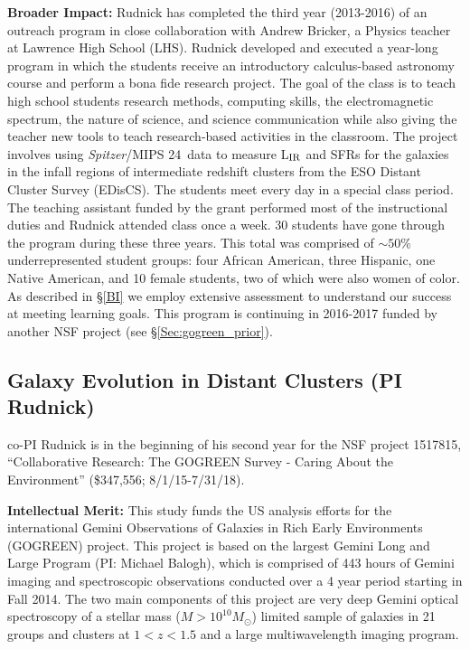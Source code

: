 \documentclass[11pt, preprint]{aastex}
\begin{document}
{\textbf{Broader Impact:} Rudnick has completed the third year
(2013-2016) of an outreach program in close collaboration with Andrew
Bricker, a Physics teacher at Lawrence High School (LHS). Rudnick
developed and executed a year-long program in which the students
receive an introductory calculus-based astronomy course and perform a
bona fide research project. The goal of the class is to teach high
school students research methods, computing skills, the
electromagnetic spectrum, the nature of science, and science
communication while also giving the teacher new tools to teach
research-based activities in the classroom.  The project involves
using \textit{Spitzer}/MIPS 24\micron\ data to measure L$_{\rm IR}$
and SFRs for the galaxies in the infall regions of intermediate
redshift clusters from the ESO Distant Cluster Survey (EDisCS). The
students meet every day in a special class period. The teaching
assistant funded by the grant performed most of the instructional
duties and Rudnick attended class once a week.  30 students have gone
through the program during these three years.  This total was
comprised of $\sim 50\%$ underrepresented student groups: four African
American, three Hispanic, one Native American, and 10 female students,
two of which were also women of color.  As described in \S\ref{BI} we
employ extensive assessment to understand our success at meeting
learning goals.  This program is continuing in 2016-2017 funded by
another NSF project (see \S\ref{Sec:gogreen_prior}).

\vspace*{-.7cm}
\subsection{Galaxy Evolution in Distant Clusters (PI Rudnick)}
\vspace*{-.4cm}
\label{Sec:gogreen_prior}

co-PI Rudnick is in the beginning of his second year for the NSF
project 1517815, ``Collaborative Research: The GOGREEN Survey - Caring
About the Environment'' (\$347,556; 8/1/15-7/31/18).

\textbf{Intellectual Merit:} This study funds the US analysis efforts
for the international Gemini Observations of Galaxies in Rich Early
Environments (GOGREEN) project.  This project is based on the largest
Gemini Long and Large Program (PI: Michael Balogh), which is comprised
of 443 hours of Gemini imaging and spectroscopic observations
conducted over a 4 year period starting in Fall 2014.  The two main
components of this project are very deep Gemini optical spectroscopy
of a stellar mass ($M>10^{10}M_\odot$) limited sample of galaxies in
21 groups and clusters at $1<z<1.5$ and a large multiwavelength
imaging program. 

}
\end{document}
